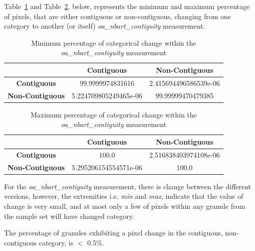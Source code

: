 \documentclass[a4paper]{article}
\begin{document}

    \begin{flushleft}
      Table~\ref{table:7} and Table~\ref{table:8}, below, represents the minimum and maximum percentage of pixels, that are either contiguous or non-contiguous, changing from one category to another (or itself) \textit{oa\_nbart\_contiguity} measurement.
    \end{flushleft}

    \begin{table}[ht!]
      \caption{Minimum percentage of categorical change within the \textit{oa\_nbart\_contiguity} measurement}\label{table:7}
      \centering
      \begin{tabular}{ccc} \midrule
        & \textbf{Contiguous} & \textbf{Non-Contiguous} \\ \midrule
        \textbf{Contiguous} & 99.9999974831616 & 2.415694496586539e-06 \\
        \textbf{Non-Contiguous} & 5.224709805249465e-06 & 99.99999470479385 \\
      \end{tabular}
    \end{table}

    \begin{table}[ht!]
      \caption{Maximum percentage of categorical change within the \textit{oa\_nbart\_contiguity} measurement}\label{table:8}
      \centering
      \begin{tabular}{ccc} \midrule
        & \textbf{Contiguous} & \textbf{Non-Contiguous} \\ \midrule
        \textbf{Contiguous} & 100.0 & 2.516838403974108e-06 \\
        \textbf{Non-Contiguous} & 5.295206154554571e-06 & 100.0 \\
      \end{tabular}
    \end{table}

    \begin{flushleft}
      For the \textit{oa\_nbart\_contiguity} measurement, there is change between the different versions, however, the extremities i.e. \textit{min} and \textit{max}, indicate that the value of change is very small, and at most only a few of pixels within any granule from the sample set will have changed category. \par
      The percentage of granules exhibiting a pixel change in the contiguous, non-contiguous category, is $<$ 0.5\%.
    \end{flushleft}
\end{document}
